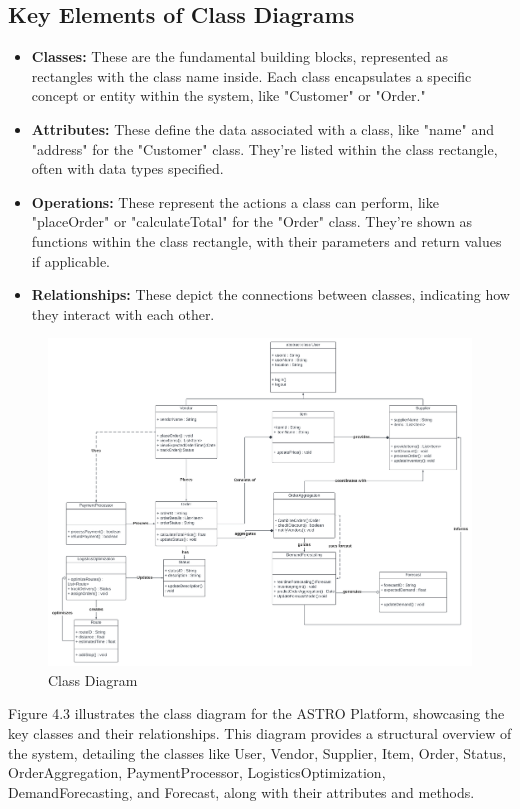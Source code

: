 \subsection{Key Elements of Class Diagrams}
\begin{itemize}
    \item \textbf{Classes:} These are the fundamental building blocks, represented as rectangles with the class name inside. Each class encapsulates a specific concept or entity within the system, like "Customer" or "Order."
    \item \textbf{Attributes:} These define the data associated with a class, like "name" and "address" for the "Customer" class. They’re listed within the class rectangle, often with data types specified.
    \item \textbf{Operations:} These represent the actions a class can perform, like "placeOrder" or "calculateTotal" for the "Order" class. They’re shown as functions within the class rectangle, with their parameters and return values if applicable.
    \item \textbf{Relationships:} These depict the connections between classes, indicating how they interact with each other.
\end{itemize}
\begin{figure}[H]
    \centering
    \includegraphics[width=1\textwidth]{Figures/Class Diagram.png}
    \caption{Class Diagram}
    \label{fig:class-diagram}
\end{figure}
\noindent Figure 4.3 illustrates the class diagram for the ASTRO Platform, showcasing the key classes and their relationships. This diagram provides a structural overview of the system, detailing the classes like User, Vendor, Supplier, Item, Order, Status, OrderAggregation, PaymentProcessor, LogisticsOptimization, DemandForecasting, and Forecast, along with their attributes and methods.
